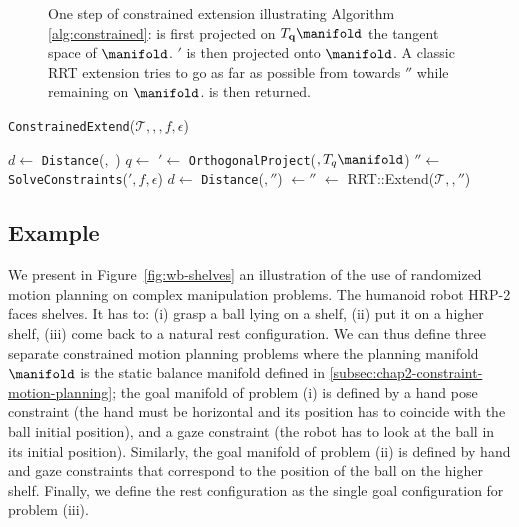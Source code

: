 \begin{figure}
\begin{minipage}[c]{0.3\linewidth}

\end{minipage}

\caption{One step of constrained extension illustrating Algorithm
  \ref{alg:constrained}:  is first projected on
  $T_{\mathbf{q}}\manifold$ the tangent space of $\manifold$. $'$ is then
  projected onto $\manifold$. A classic RRT extension tries to go as
  far as possible from  towards $''$ while remaining
  on $\manifold$.  is then returned.}
\label{fig:gikrrt}
\end{figure}

\begin{algorithm}
  \caption{\texttt{ConstrainedExtend}($\mathcal{T},$$,$$,f,\epsilon$)}
  \label{alg:constrained}
  \begin{algorithmic}
    \STATE $d \leftarrow$ \texttt{Distance}($,$ )
    \STATE $q \leftarrow$ 
    \STATE {}$' \leftarrow$ \texttt{OrthogonalProject}($, T_q\manifold$)
    \STATE {}$'' \leftarrow$ \texttt{SolveConstraints}($',f,\epsilon$)
    \STATE $d \leftarrow$ \texttt{Distance}(\config{}$,$$''$)
    \STATE \config{}$ \leftarrow $$''$
    \ENDWHILE
    \STATE {}$ \leftarrow$ RRT::Extend($\mathcal{T},$$,$$''$)
  \end{algorithmic}
\end{algorithm}
    
\subsection{Example}

We present in Figure~\ref{fig:wb-shelves} an illustration of the use
of randomized motion planning on complex manipulation problems. The
humanoid robot HRP-2 faces shelves. It has to: (i) grasp a ball lying
on a shelf, (ii) put it on a higher shelf, (iii) come back to a
natural rest configuration. We can thus define three separate
constrained motion planning problems where the planning manifold
$\manifold$ is the static balance manifold defined in
\ref{subsec:chap2-constraint-motion-planning}; the goal manifold of
problem (i) is defined by a hand pose constraint (the hand must be
horizontal and its position has to coincide with the ball initial
position), and a gaze constraint (the robot has to look at the ball in
its initial position). Similarly, the goal manifold of problem (ii) is
defined by hand and gaze constraints that correspond to the position
of the ball on the higher shelf. Finally, we define the rest
configuration as the single goal configuration for problem (iii).


